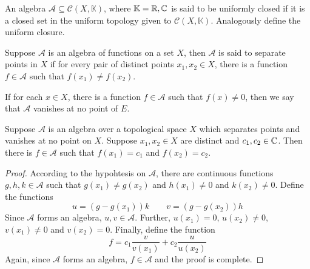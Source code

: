 \begin{definition}
    An algebra $\mathscr A\subseteq\mathcal C(X,\mathbb K)$, where $\mathbb K = \mathbb{R},\mathbb{C}$ is said to be uniformly closed if it is a closed set in the uniform topology given to $\mathcal C(X,\mathbb K)$. Analogously define the uniform closure.
\end{definition}

\begin{definition}
    Suppose $\mathscr A$ is an algebra of functions on a set $X$, then $\mathscr A$ is said to separate points in $X$ if for every pair of distinct points $x_1,x_2\in X$, there is a function $f\in\mathscr A$ such that $f(x_1)\ne f(x_2)$.

    If for each $x\in X$, there is a function $f\in\mathscr A$ such that $f(x)\ne 0$, then we say that $\mathscr A$ vanishes at no point of $E$.
\end{definition}

\begin{lemma}
    Suppose $\mathscr A$ is an algebra over a topological space $X$ which separates points and vanishes at no point on $X$. Suppose $x_1,x_2\in X$ are distinct and $c_1,c_2\in\mathbb{C}$. Then there is $f\in\mathscr A$ such that $f(x_1) = c_1$ and $f(x_2) = c_2$.
\end{lemma}
\begin{proof}
    According to the hypohtesis on $\mathscr A$, there are continuous functions $g,h,k\in\mathscr A$ such that $g(x_1)\ne g(x_2)$ and $h(x_1)\ne 0$ and $k(x_2)\ne 0$. Define the functions 
    \begin{equation*}
        u = (g - g(x_1))k\qquad v = (g - g(x_2))h
    \end{equation*}
    Since $\mathscr A$ forms an algebra, $u,v\in\mathscr A$. Further, $u(x_1) = 0$, $u(x_2)\ne 0$, $v(x_1)\ne 0$ and $v(x_2) = 0$. Finally, define the function 
    \begin{equation*}
        f = c_1\frac{v}{v(x_1)} + c_2\frac{u}{u(x_2)}
    \end{equation*}
    Again, since $\mathscr A$ forms an algebra, $f\in\mathscr A$ and the proof is complete.
\end{proof}

